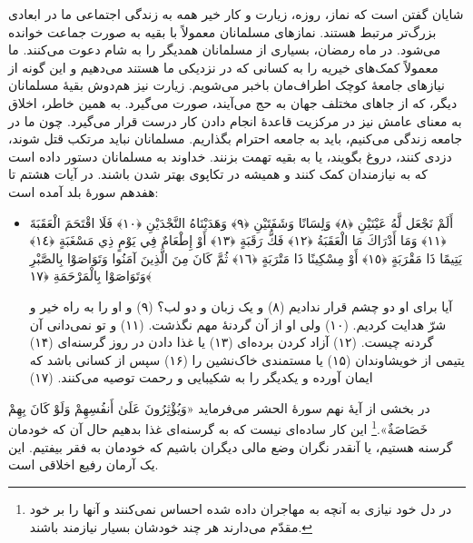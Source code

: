 شایان گفتن است که نماز، روزه، زیارت و کار خیر همه به زندگی اجتماعی ما در ابعادی بزرگ‌تر مرتبط هستند. نمازهای مسلمانان معمولاً با بقیه به صورت جماعت خوانده می‌شود. در ماه رمضان، بسیاری از مسلمانان همدیگر را به شام دعوت می‌کنند. ما معمولاً کمک‌های خیریه را به کسانی که در نزدیکی ما هستند می‌دهیم و این گونه از نیازهای جامعهٔ کوچک اطراف‌مان باخبر می‌شویم. زیارت نیز هم‌دوش بقیهٔ مسلمانان دیگر، که از جاهای مختلف جهان به حج می‌آیند، صورت می‌گیرد. به همین خاطر، اخلاق به معنای عامش نیز در مرکزیت قاعدهٔ انجام دادن کار درست قرار می‌گیرد. چون ما در جامعه زندگی می‌کنیم، باید به جامعه احترام بگذاریم. مسلمانان نباید مرتکب قتل شوند، دزدی کنند، دروغ بگویند، یا به بقیه تهمت بزنند. خداوند به مسلمانان دستور داده است که به نیازمندان کمک کنند و همیشه در تکاپوی بهتر شدن باشند. در آیات هشتم تا هفدهم سورهٔ بلد آمده است:

\begin{itemize}
	\item[]
	{
		أَلَمْ نَجْعَل لَّهُ عَيْنَيْنِ ﴿٨﴾ وَلِسَانًا وَشَفَتَيْنِ ﴿٩﴾ وَهَدَيْنَاهُ النَّجْدَيْنِ ﴿١٠﴾ فَلَا اقْتَحَمَ الْعَقَبَةَ ﴿١١﴾ وَمَا أَدْرَاكَ مَا الْعَقَبَةُ ﴿١٢﴾ فَكُّ رَقَبَةٍ ﴿١٣﴾ أَوْ إِطْعَامٌ فِي يَوْمٍ ذِي مَسْغَبَةٍ ﴿١٤﴾ يَتِيمًا ذَا مَقْرَبَةٍ ﴿١٥﴾ أَوْ مِسْكِينًا ذَا مَتْرَبَةٍ ﴿١٦﴾ ثُمَّ كَانَ مِنَ الَّذِينَ آمَنُوا وَتَوَاصَوْا بِالصَّبْرِ وَتَوَاصَوْا بِالْمَرْحَمَةِ ﴿١٧﴾}
	
	{
		آیا برای او دو چشم قرار ندادیم (۸) و یک زبان و دو لب؟ (۹) و او را به راه خیر و شرّ هدایت کردیم. (۱۰) ولی او از آن گردنهٔ مهم نگذشت. (۱۱) و تو نمی‌دانی آن گردنه چیست. (۱۲) آزاد کردن برده‌ای (۱۳) یا غذا دادن در روز گرسنه‌‌ای (۱۴) یتیمی از خویشاوندان (۱۵) یا مستمندی خاک‌نشین را (۱۶) سپس از کسانی باشد که ایمان آورده و یکدیگر را به شکیبایی و رحمت توصیه می‌کنند. (۱۷)
	}
\end{itemize}

در بخشی از آیهٔ نهم سورهٔ الحشر می‌فرماید { «وَيُؤْثِرُونَ عَلَىٰ أَنفُسِهِمْ وَلَوْ كَانَ بِهِمْ خَصَاصَةٌ».}\footnote{در دل خود نیازی به آنچه به مهاجران داده شده احساس نمی‌کنند و آنها را بر خود مقدّم می‌دارند هر چند خودشان بسیار نیازمند باشند.} این کار ساده‌ای نیست که به گرسنه‌ای غذا بدهیم حال آن که خودمان گرسنه هستیم، یا آنقدر نگران وضع مالی دیگران باشیم که خودمان به فقر بیفتیم. این یک آرمان رفیع اخلاقی است.

